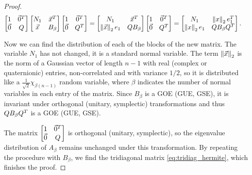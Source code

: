 \begin{proof}
    \begin{align*}
        \begin{bmatrix}
            1 & \vec0^T \\ 
            \vec0 & Q
        \end{bmatrix} 
        \begin{bmatrix}
            N_1 & \vec x^T \\ 
            \vec x & B_{\beta}
        \end{bmatrix}  
        \begin{bmatrix}
            1 & \vec 0^T \\ 
            \vec 0 & Q^T
        \end{bmatrix} &= \begin{bmatrix}
            N_1 & \vec x^T \\ 
            \left\lVert\vec x\right\rVert_2e_1 & Q B_{\beta}
        \end{bmatrix}  
        \begin{bmatrix}
            1 & \vec0^T \\ 
            \vec0 & Q^T
        \end{bmatrix} 
        =
        \begin{bmatrix}
            N_1 & \left\lVert x\right\rVert_2e_1^T \\ 
            \left\lVert x\right\rVert_2 e_1 & Q B_\beta Q^T
        \end{bmatrix}.
    \end{align*}

    Now we can find the distribution of each of the blocks of the new matrix. The variable $N_1$ has not changed, it is a standard normal variable. The term $\left\lVert\vec x\right\rVert_2$ is the norm of a Gaussian vector of length $n-1$ with real (complex or quaternionic) entries, non-correlated and with variance $1/2$, so it is distributed like a $\frac1{\sqrt{2}}\chi_{\beta(n-1)}$ random variable, where $\beta$ indicates the number of normal variables in each entry of the matrix. Since $B_\beta$ is a GOE (GUE, GSE), it is invariant under orthogonal (unitary, symplectic) transformations and thus $Q B_{\beta} Q^T$ is a GOE (GUE, GSE).

    The matrix $ \begin{bmatrix}
        1 & \vec0^T \\ 
        \vec0 & Q
    \end{bmatrix}$ is orthogonal (unitary, symplectic), so the eigenvalue distribution of $A_\beta$ remains unchanged under this transformation. By repeating the procedure with $B_\beta$, we find the tridiagonal matrix \eqref{eq:tridiag_hermite}, which finishes the proof.
\end{proof}


